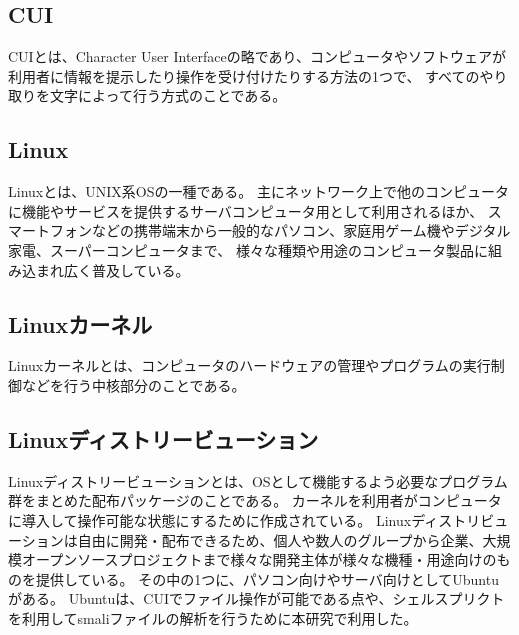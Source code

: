 


\subsection{CUI}
CUIとは、Character User Interfaceの略であり、コンピュータやソフトウェアが利用者に情報を提示したり操作を受け付けたりする方法の1つで、
すべてのやり取りを文字によって行う方式のことである。


\subsection{Linux}
Linuxとは、UNIX系OSの一種である。
主にネットワーク上で他のコンピュータに機能やサービスを提供するサーバコンピュータ用として利用されるほか、
スマートフォンなどの携帯端末から一般的なパソコン、家庭用ゲーム機やデジタル家電、スーパーコンピュータまで、
様々な種類や用途のコンピュータ製品に組み込まれ広く普及している。


\subsection{Linuxカーネル}
Linuxカーネルとは、コンピュータのハードウェアの管理やプログラムの実行制御などを行う中核部分のことである。


\subsection{Linuxディストリービューション}
Linuxディストリービューションとは、OSとして機能するよう必要なプログラム群をまとめた配布パッケージのことである。
カーネルを利用者がコンピュータに導入して操作可能な状態にするために作成されている。
Linuxディストリビューションは自由に開発・配布できるため、個人や数人のグループから企業、大規模オープンソースプロジェクトまで様々な開発主体が様々な機種・用途向けのものを提供している。
その中の1つに、パソコン向けやサーバ向けとしてUbuntuがある。
Ubuntuは、CUIでファイル操作が可能である点や、シェルスプリクトを利用してsmaliファイルの解析を行うために本研究で利用した。


